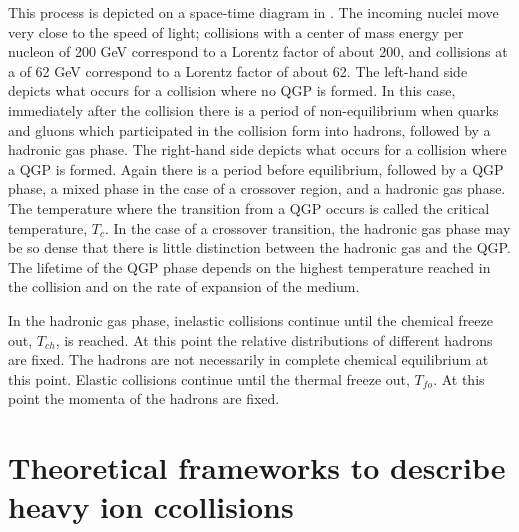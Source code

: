 This process is depicted on a space-time diagram in .  The incoming nuclei move very close to the speed of light; collisions with a center of mass energy per nucleon \sNN of 200 GeV correspond to a Lorentz factor of about 200, and collisions at a \sNN of 62 GeV correspond to a Lorentz factor of about 62.  The left-hand side depicts what occurs for a collision where no QGP is formed.  In this case, immediately after the collision there is a period of non-equilibrium when quarks and gluons which participated in the collision form into hadrons, followed by a hadronic gas phase.  The right-hand side depicts what occurs for a collision where a QGP is formed.  Again there is a period before equilibrium, followed by a QGP phase, a mixed phase in the case of a crossover region, and a hadronic gas phase.  The temperature where the transition from a QGP occurs is called the critical temperature, $T_c$.  In the case of a crossover transition, the hadronic gas phase may be so dense that there is little distinction between the hadronic gas and the QGP.  The lifetime of the QGP phase depends on the highest temperature reached in the collision and on the rate of expansion of the medium.

In the hadronic gas phase, inelastic collisions continue until the chemical freeze out, $T_{ch}$, is reached.  At this point the relative distributions of different hadrons are fixed.  The hadrons are not necessarily in complete chemical equilibrium at this point.  Elastic collisions continue until the thermal freeze out, $T_{fo}$.  At this point the momenta of the hadrons are fixed.



\section{Theoretical frameworks to describe heavy ion ccollisions\label{TheoreticalFramework}}

